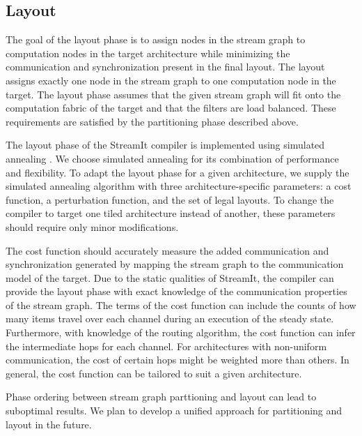 \subsection{Layout}
\label{sec:layout}

The goal of the layout phase is to assign nodes in the stream graph to
computation nodes in the target architecture while minimizing the
communication and synchronization present in the final layout.  The
layout assigns exactly one node in the stream graph to one computation
node in the target.  The layout phase assumes that the given stream
graph will fit onto the computation fabric of the target and that the
filters are load balanced.  These requirements are satisfied by the
partitioning phase described above.

The layout phase of the StreamIt compiler is implemented using
simulated annealing \cite{simanneal}.  We choose simulated annealing
for its combination of performance and flexibility.  To adapt the
layout phase for a given architecture, we supply the simulated
annealing algorithm with three architecture-specific parameters: a
cost function, a perturbation function, and the set of legal layouts.
To change the compiler to target one tiled architecture instead of
another, these parameters should require only minor modifications.

The cost function should accurately measure the added communication
and synchronization generated by mapping the stream graph to the
communication model of the target.  Due to the static qualities of
StreamIt, the compiler can provide the layout phase with exact
knowledge of the communication properties of the stream graph.  The
terms of the cost function can include the counts of how many items
travel over each channel during an execution of the steady state.
Furthermore, with knowledge of the routing algorithm, the cost
function can infer the intermediate hops for each channel.  For
architectures with non-uniform communication, the cost of certain hops
might be weighted more than others.  In general, the cost function can
be tailored to suit a given architecture.

Phase ordering between stream graph parttioning and layout can lead to
suboptimal results. We plan to develop a unified approach for
partitioning and layout in the future.
